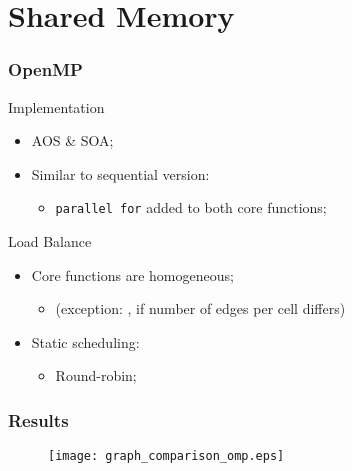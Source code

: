 \section{Shared Memory}


\begin{frame}
	\frametitle{OpenMP}
	\begin{block}{Implementation}
		\begin{itemize}
			\item AOS \& SOA;
			\item Similar to sequential version:
			\begin{itemize}
				\item \texttt{parallel for} added to both core functions;
			\end{itemize}
		\end{itemize}
	\end{block}

	\begin{block}{Load Balance}
		\begin{itemize}
			\item Core functions are homogeneous;
			\begin{itemize}
				\item [] (exception: \update, if number of edges per cell differs)
			\end{itemize}
			\item Static scheduling:
			\begin{itemize}
				\item Round-robin;
			\end{itemize}
		\end{itemize}
	\end{block}
\end{frame}

\begin{frame}
	\frametitle{Results}
	\begin{figure}
		\centering
		\texttt{[image: graph\_comparison\_omp.eps]}
	\end{figure}
\end{frame}

